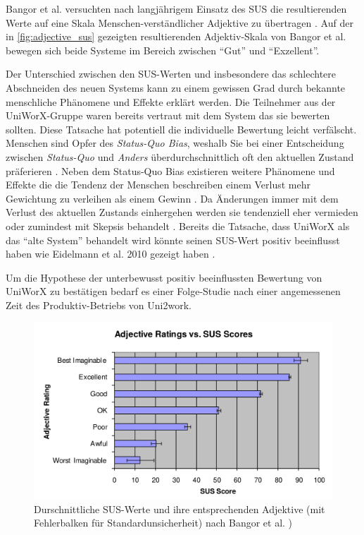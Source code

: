 \documentclass[11pt,a4paper,twoside,ngerman]{article}
\begin{document}
Bangor et al. versuchten nach langjährigem Einsatz des SUS die resultierenden Werte auf eine Skala Menschen-verständlicher Adjektive zu übertragen \cite{bangor_sus_adjective}. Auf der in \autoref{fig:adjective_sus} gezeigten resultierenden Adjektiv-Skala von Bangor et al. bewegen sich beide Systeme im Bereich zwischen "`Gut"' und "`Exzellent"'.

Der Unterschied zwischen den SUS-Werten und insbesondere das schlechtere Abschneiden des neuen Systems kann zu einem gewissen Grad durch bekannte menschliche Phänomene und Effekte erklärt werden. Die Teilnehmer aus der UniWorX-Gruppe waren bereits vertraut mit dem System das sie bewerten sollten. Diese Tatsache hat potentiell die individuelle Bewertung leicht verfälscht. Menschen sind Opfer des \textit{Status-Quo Bias}, weshalb Sie bei einer Entscheidung zwischen \textit{Status-Quo} und \textit{Anders} überdurchschnittlich oft den aktuellen Zustand präferieren \cite{Samuelson1988}. Neben dem Status-Quo Bias existieren weitere Phänomene und Effekte die die Tendenz der Menschen beschreiben einem Verlust mehr Gewichtung zu verleihen als einem Gewinn \cite{endowmentkahnemann}. Da Änderungen immer mit dem Verlust des aktuellen Zustands einhergehen werden sie tendenziell eher vermieden oder zumindest mit Skepsis behandelt \cite{lewinresistance}.
Bereits die Tatsache, dass UniWorX als das "`alte System"' behandelt wird könnte seinen SUS-Wert positiv beeinflusst haben wie Eidelmann et al. 2010 gezeigt haben \cite{eidelmannlonger}.

Um die Hypothese der unterbewusst positiv beeinflussten Bewertung von UniWorX zu bestätigen bedarf es einer Folge-Studie nach einer angemessenen Zeit des Produktiv-Betriebs von Uni2work.

\begin{figure}[h]
    \centering
    \includegraphics[width=\textwidth]{images/adjectivesus.png}
    \caption{Durschnittliche SUS-Werte und ihre entsprechenden Adjektive (mit Fehlerbalken für Standardunsicherheit) nach Bangor et al. \cite[S.119]{bangor_sus_adjective})}
    \label{fig:adjective_sus}
\end{figure}
\end{document}
